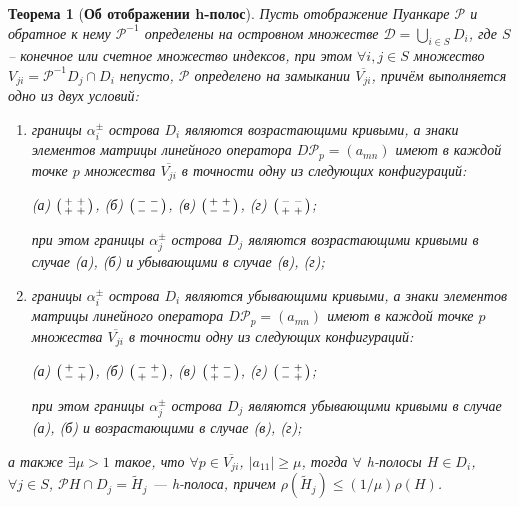 \documentclass{article}
\newtheorem*{theorem}{Теорема}
\newenvironment{psm}
	{\left( \begin{smallmatrix}}
	{\end{smallmatrix} \right) }
\begin{document}
\begin{theorem}[{\bf Об отображении h-полос}]

Пусть отображение Пуанкаре $\mathcal{P}$ и обратное к нему $\mathcal{P}^{-1}$ определены на островном множестве $\mathcal{D} = \bigcup_{i \in S} D_i$, где $S$ -- конечное или счетное множество индексов, при этом $\forall i, j \in S$ множество $V_{ji} = \mathcal{P}^{-1} D_j \cap D_i$ непусто, $\mathcal{P}$ определено на замыкании $\overline{V_{ji}}$, причём выполняется одно из двух условий:
\begin{enumerate}
	\item[(1)] границы $\alpha_i^{\pm}$ острова $D_i$ являются возрастающими кривыми, а знаки элементов матрицы линейного оператора $D \mathcal{P}_p = (a_{mn})$ имеют в каждой точке $p$ множества $\overline{V_{ji}}$ в точности одну из следующих конфигураций:
		\begin{center}
			(а) $\begin{psm} + & + \\ + & + \end{psm}$, \quad
			(б) $\begin{psm} - & - \\ - & - \end{psm}$, \quad
			(в) $\begin{psm} + & + \\ - & - \end{psm}$, \quad
			(г) $\begin{psm} - & - \\ + & + \end{psm}$;
		\end{center}
		при этом границы $\alpha_j^{\pm}$ острова $D_j$ являются возрастающими кривыми в случае (а), (б) и убывающими в случае (в), (г);
	\item[(2)] границы $\alpha_i^{\pm}$ острова $D_i$ являются убывающими кривыми, а знаки элементов матрицы линейного оператора $D \mathcal{P}_p = (a_{mn})$ имеют в каждой точке $p$ множества $\overline{V_{ji}}$ в точности одну из следующих конфигураций:
		\begin{center}
			(а) $\begin{psm} + & - \\ - & + \end{psm}$, \quad
			(б) $\begin{psm} - & + \\ + & - \end{psm}$,	\quad
			(в) $\begin{psm} + & - \\ + & - \end{psm}$, \quad
			(г) $\begin{psm} - & + \\ - & + \end{psm}$;		
		\end{center}
		при этом границы $\alpha_j^{\pm}$ острова $D_j$ являются убывающими кривыми в случае (а), (б) и возрастающими в случае (в), (г);
	\end{enumerate}
а также $\exists \mu > 1$ такое, что $\forall p \in \overline{V_{ji}}$, $|a_{11}| \ge \mu$, тогда $\forall$ h-полосы $H \in D_i$, $\forall j \in S$, $\mathcal{P} H \cap D_j = \widetilde{H}_j$ --- h-полоса, причем $\rho(\widetilde{H}_j) \le (1 / \mu) \rho(H)$.


\end{theorem}
\end{document}
